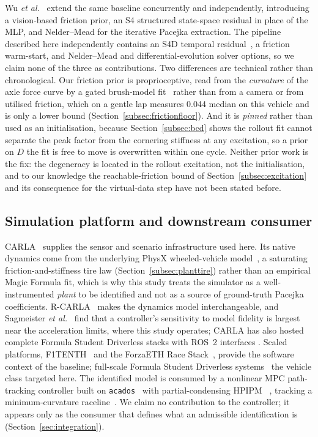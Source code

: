 Wu \emph{et al.}~\cite{visionsysid2026} extend the same baseline concurrently
and independently, introducing a vision-based friction prior, an S4 structured
state-space residual in place of the MLP, and Nelder--Mead for the iterative
Pacejka extraction. The pipeline described here independently contains an S4D
temporal residual~\cite{gu2022s4d,gu2022s4}, a friction warm-start, and
Nelder--Mead and differential-evolution solver options, so we claim none of the
three as contributions. Two differences are technical rather than
chronological. Our friction prior is proprioceptive, read from the
\emph{curvature} of the axle force curve by a gated brush-model
fit~\cite{fiala1954,acosta2017friction} rather than from a camera or from
utilised friction, which on a gentle lap measures \num{0.044} median on this
vehicle and is only a lower bound (Section~\ref{subsec:frictionfloor}). And it
is \emph{pinned} rather than used as an initialisation, because
Section~\ref{subsec:bcd} shows the rollout fit cannot separate the peak factor
from the cornering stiffness at any excitation, so a prior on $D$ the fit is
free to move is overwritten within one cycle. Neither prior work is the fix:
the degeneracy is located in the rollout excitation, not the initialisation,
and to our knowledge the reachable-friction bound of
Section~\ref{subsec:excitation} and its consequence for the virtual-data step
have not been stated before.

\subsection{Simulation platform and downstream consumer}

CARLA~\cite{carla2017} supplies the sensor and scenario infrastructure used
here. Its native dynamics come from the underlying PhysX wheeled-vehicle
model~\cite{physxvehicle}, a saturating friction-and-stiffness tire law
(Section~\ref{subsec:planttire}) rather than an empirical Magic Formula fit,
which is why this study treats the simulator as a well-instrumented \emph{plant}
to be identified and not as a source of ground-truth Pacejka coefficients.
R-CARLA~\cite{rcarla2025} makes the dynamics model interchangeable, and
Sagmeister \emph{et al.}~\cite{simfidelity2026} find that a controller's
sensitivity to model fidelity is largest near the acceleration limits, where
this study operates; CARLA has also hosted complete Formula Student Driverless
stacks with ROS~2 interfaces \cite{carlaros2025}. Scaled
platforms, F1TENTH~\cite{f1tenth2020} and the ForzaETH Race
Stack~\cite{forzaeth2024}, provide the software context of the baseline;
full-scale Formula Student Driverless systems~\cite{amz2020} the vehicle class
targeted here. The identified model is consumed by a nonlinear MPC path-tracking
controller built on \texttt{acados}~\cite{acados2022} with partial-condensing
HPIPM~\cite{hpipm2020} \cite{liniger2015,kabzan2019lbmpc}, tracking a
minimum-curvature raceline~\cite{heilmeier2020}. We claim no contribution to the
controller; it appears only as the consumer that defines what an admissible
identification is (Section~\ref{sec:integration}).
